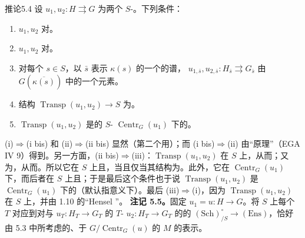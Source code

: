 \begin{SGAresult}{推论}{5.4}
设 $u_1,u_2:H\rightrightarrows G$ 为两个 $S$-。下列条件：
\begin{enumerate}
\item[(i)] $u_1,u_2$ 对。
\item[(i bis)] $u_1,u_2$ 对。
\item[(ii)] 对每个 $s\in S$，以 $\bar s$ 表示 $\kappa(s)$ 的一个的谱， $u_{1,\bar s},u_{2,\bar s}:H_{\bar s}\rightrightarrows G_{\bar s}$ 由 $G(\overline{\kappa(s)})$ 中的一个元素。
\item[(ii bis)] 结构 $\operatorname{Transp}(u_1,u_2)\to S$ 为。
\item[(iii)] $\operatorname{Transp}(u_1,u_2)$ 是的 $S$- $\operatorname{Centr}_G(u_1)$ 下的。
\end{enumerate}
\end{SGAresult}
(i)$\Rightarrow$(i bis) 和 (ii)$\Rightarrow$(ii bis) 显然（第二个用）；而 (i bis)$\Rightarrow$(ii) 由“原理”（EGA IV 9）得到。另一方面，(ii bis)$\Rightarrow$(iii)：$\operatorname{Transp}(u_1,u_2)$ 在 $S$ 上，从而；又为，从而。所以它在 $S$ 上且，当且仅当其结构为。此外，它在 $\operatorname{Centr}_G(u_1)$ 下，而后者在 $S$ 上且；于是最后这个条件也于说 $\operatorname{Transp}(u_1,u_2)$ 是 $\operatorname{Centr}_G(u_1)$ 下的（默认指意义下）。最后 (iii)$\Rightarrow$(i)，因为 $\operatorname{Transp}(u_1,u_2)$ 在 $S$ 上，并由 1.10 的“Hensel ”。
\textbf{注记 5.5。}固定 $u_1=u:H\to G$。将 $S$ 上每个 $T$ 对应到对与 $u_T:H_T\to G_T$ 的 $T$- $u_2:H_T\to G_T$ 的的 $(\mathrm{Sch})^\circ_{/S}\to(\mathrm{Ens})$，恰好由 5.3 中所考虑的、于 $G/\operatorname{Centr}_G(u)$ 的 $M$ 的表示。
